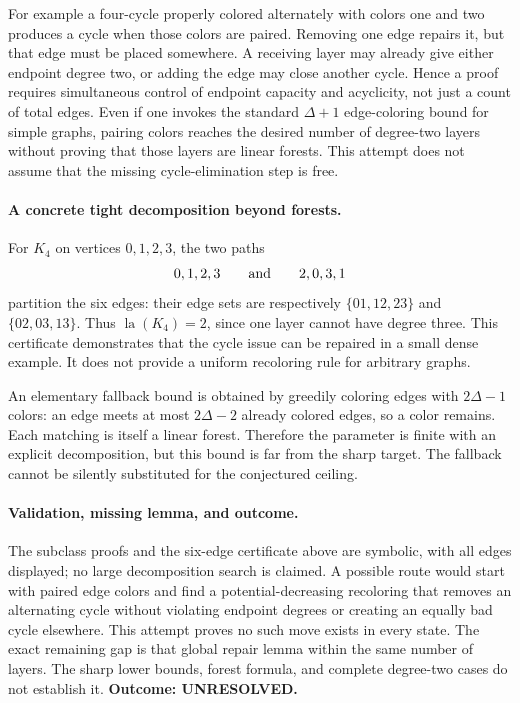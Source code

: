 \documentclass[11pt,a4paper]{article}
\begin{document}
For example a four-cycle properly colored alternately with colors one
and two produces a cycle when those colors are paired. Removing one
edge repairs it, but that edge must be placed somewhere. A receiving
layer may already give either endpoint degree two, or adding the edge
may close another cycle. Hence a proof requires simultaneous control
of endpoint capacity and acyclicity, not just a count of total edges.
Even if one invokes the standard $\Delta+1$ edge-coloring bound for
simple graphs, pairing colors reaches the desired number of degree-two
layers without proving that those layers are linear forests. This
attempt does not assume that the missing cycle-elimination step is free.

\paragraph{A concrete tight decomposition beyond forests.}
For $K_4$ on vertices $0,1,2,3$, the two paths
\[
                      0,1,2,3\qquad\hbox{and}\qquad2,0,3,1
\]
partition the six edges: their edge sets are respectively
$\{01,12,23\}$ and $\{02,03,13\}$. Thus
$\operatorname{la}(K_4)=2$, since one layer cannot have degree three.
This certificate demonstrates that the cycle issue can be repaired
in a small dense example. It does not provide a uniform recoloring
rule for arbitrary graphs.

An elementary fallback bound is obtained by greedily coloring edges
with $2\Delta-1$ colors: an edge meets at most $2\Delta-2$ already
colored edges, so a color remains. Each matching is itself a linear
forest. Therefore the parameter is finite with an explicit decomposition,
but this bound is far from the sharp target. The fallback cannot be
silently substituted for the conjectured ceiling.

\paragraph{Validation, missing lemma, and outcome.}
The subclass proofs and the six-edge certificate above are symbolic,
with all edges displayed; no large decomposition search is claimed.
A possible route would start with paired edge colors and find a
potential-decreasing recoloring that removes an alternating cycle
without violating endpoint degrees or creating an equally bad cycle
elsewhere. This attempt proves no such move exists in every state.
The exact remaining gap is that global repair lemma within the same
number of layers. The sharp lower bounds, forest formula, and complete
degree-two cases do not establish it. \textbf{Outcome: UNRESOLVED.}
\end{document}
